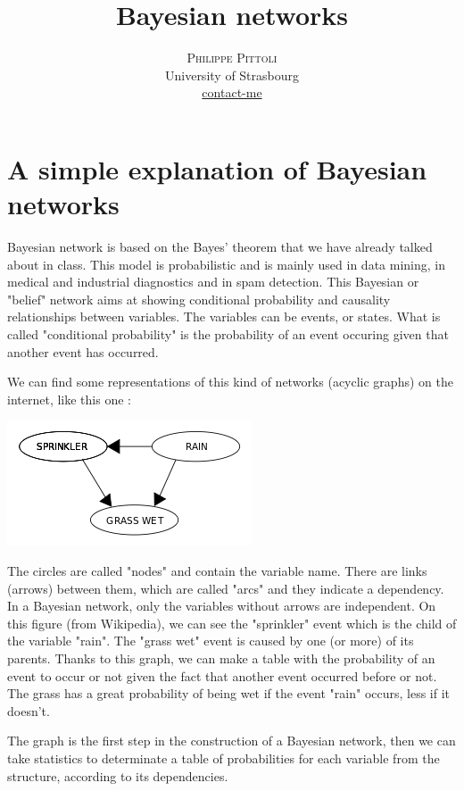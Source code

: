 \documentclass[twoside]{article}
\title{\vspace{-15mm}\fontsize{24pt}{10pt}\selectfont\textbf{Bayesian networks}} %
\author{
\large
\textsc{Philippe Pittoli}\\[2mm] %
\normalsize University of Strasbourg \\ %
\normalsize \href{mailto:philippe.pittoli@etu.unistra.fr}{contact-me} %
\vspace{-5mm}
}
\date{}
\begin{document}
\maketitle %

\thispagestyle{fancy} %



\section{A simple explanation of Bayesian networks}

Bayesian network is based on the Bayes' theorem that we have already talked about in class.
This model is probabilistic and is mainly used in data mining, in medical and industrial diagnostics and in spam detection.
This Bayesian or "belief" network aims at showing conditional probability and causality relationships between variables.
The variables can be events, or states.
What is called "conditional probability" is the probability of an event occuring given that another event has occurred.

We can find some representations of this kind of networks (acyclic graphs) on the internet, like this one :

\includegraphics{SimpleBayesNetNodes.png}

The circles are called "nodes" and contain the variable name.
There are links (arrows) between them, which are called "arcs" and they indicate a dependency. 
In a Bayesian network, only the variables without arrows are independent.
On this figure (from Wikipedia), we can see the "sprinkler" event which is the child of the variable "rain".
The "grass wet" event is caused by one (or more) of its parents.
Thanks to this graph, we can make a table with the probability of an event to occur or not given the fact that another event occurred before or not.
The grass has a great probability of being wet if the event "rain" occurs, less if it doesn't.

The graph is the first step in the construction of a Bayesian network, 
then we can take statistics to determinate a table of probabilities for each variable from the structure, 
according to its dependencies.




\end{document}
